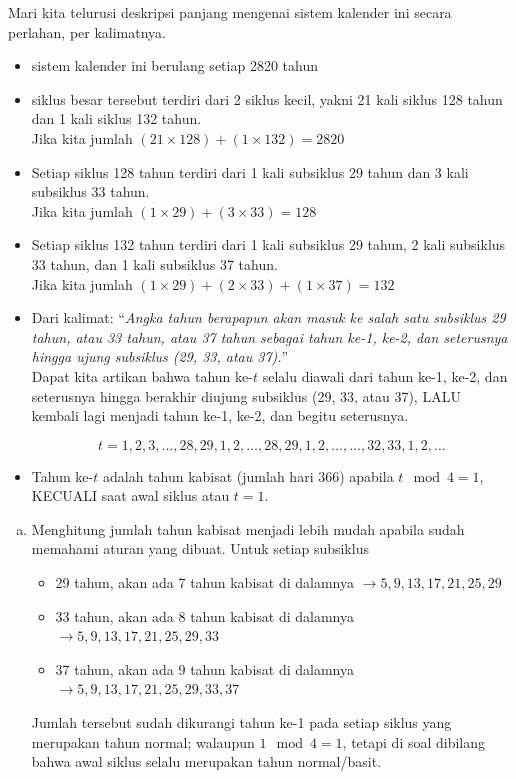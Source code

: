 \documentclass[11pt,fleqn]{exam}
\begin{document}
\begin{questions}
Mari kita telurusi deskripsi panjang mengenai sistem kalender ini secara perlahan,  per kalimatnya.
\begin{itemize}
\item sistem kalender ini berulang setiap 2820 tahun
\item siklus besar tersebut terdiri dari 2 siklus kecil, yakni 21 kali siklus 128 tahun dan 1 kali siklus 132 tahun. \\
Jika kita jumlah $(21 \times 128) + (1 \times 132) = 2820$ \checkmark
\item Setiap siklus 128 tahun terdiri dari 1 kali subsiklus 29 tahun dan 3 kali subsiklus 33 tahun. \\
Jika kita jumlah  $(1 \times 29) + (3 \times 33) = 128$ \checkmark
\item Setiap siklus 132 tahun terdiri dari 1 kali subsiklus 29 tahun, 2 kali subsiklus 33 tahun, dan 1 kali subsiklus 37 tahun. \\
Jika kita jumlah  $(1 \times 29) + (2 \times 33) + (1 \times 37) = 132$ \checkmark
\item Dari kalimat: ``\textit{Angka tahun berapapun akan masuk ke salah satu subsiklus 29 tahun, atau 33 tahun, atau 37 tahun sebagai tahun ke-1, ke-2, dan seterusnya hingga ujung subsiklus (29, 33, atau 37).}'' \\
Dapat kita artikan bahwa tahun ke-$t$ selalu diawali dari tahun ke-1, ke-2, dan seterusnya hingga berakhir diujung subsiklus (29, 33, atau 37), LALU kembali lagi menjadi tahun ke-1, ke-2, dan begitu seterusnya.

$$t = 1, 2, 3, \ldots, 28, 29, 1, 2, \ldots, 28, 29, 1, 2, \ldots, \ldots, 32, 33, 1, 2, \ldots$$

\item Tahun ke-$t$ adalah tahun kabisat (jumlah hari 366) apabila $t \mod 4 = 1$, KECUALI saat awal siklus atau $t=1$.
\end{itemize}

\begin{enumerate}[(a)]
\item Menghitung jumlah tahun kabisat menjadi lebih mudah apabila sudah memahami aturan yang dibuat. Untuk setiap subsiklus
\begin{itemize}
\item 29 tahun, akan ada 7 tahun kabisat di dalamnya $\rightarrow 5, 9, 13, 17, 21, 25, 29$
\item 33 tahun, akan ada 8 tahun kabisat di dalamnya $\rightarrow 5, 9, 13, 17, 21, 25, 29, 33$
\item 37 tahun, akan ada 9 tahun kabisat di dalamnya $\rightarrow 5, 9, 13, 17, 21, 25, 29, 33, 37$
\end{itemize}
Jumlah tersebut sudah dikurangi tahun ke-1 pada setiap siklus yang merupakan tahun normal; walaupun $1 \mod 4 = 1$, tetapi di soal dibilang bahwa awal siklus selalu merupakan tahun normal/basit.


\end{enumerate}
\end{questions}
\end{document}
